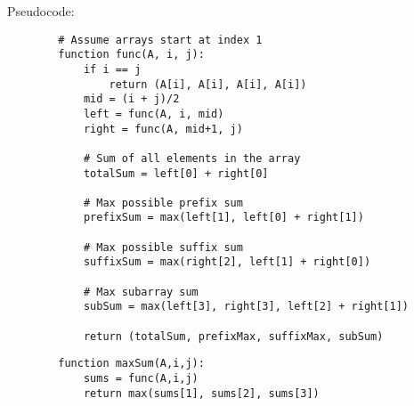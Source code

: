 \documentclass[12pt]{article}
\begin{document}
\begin{enumerate}
    Pseudocode:
    \begin{verbatim}
        # Assume arrays start at index 1
        function func(A, i, j):
            if i == j
                return (A[i], A[i], A[i], A[i])
            mid = (i + j)/2
            left = func(A, i, mid)
            right = func(A, mid+1, j)

            # Sum of all elements in the array
            totalSum = left[0] + right[0]

            # Max possible prefix sum
            prefixSum = max(left[1], left[0] + right[1])

            # Max possible suffix sum
            suffixSum = max(right[2], left[1] + right[0])

            # Max subarray sum
            subSum = max(left[3], right[3], left[2] + right[1])
        
            return (totalSum, prefixMax, suffixMax, subSum)
    \end{verbatim}
    
    \begin{verbatim}
        function maxSum(A,i,j):
            sums = func(A,i,j)
            return max(sums[1], sums[2], sums[3])

    \end{verbatim}

\end{enumerate}
\end{document}
